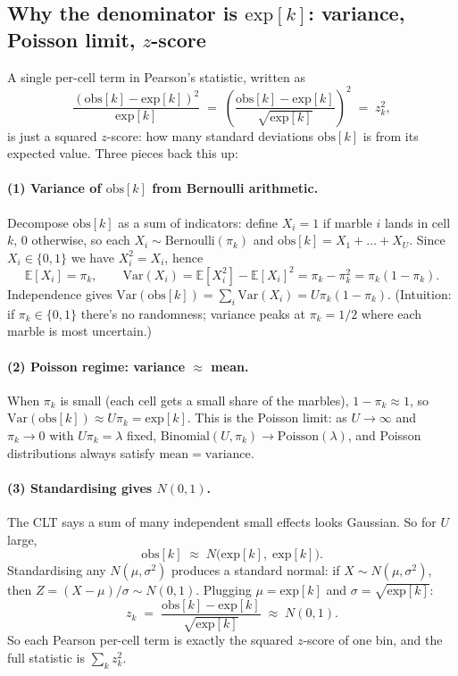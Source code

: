 \documentclass[11pt]{article}
\newcommand{\E}{\mathbb{E}}
\newcommand{\Var}{\mathrm{Var}}
\newcommand{\Pois}{\mathrm{Poisson}}
\newcommand{\Bin}{\mathrm{Binomial}}
\newcommand{\obs}{\mathrm{obs}}
\newcommand{\expc}{\mathrm{exp}}
\begin{document}
\subsection{Why the denominator is $\expc[k]$: variance, Poisson limit, $z$-score}

A single per-cell term in Pearson's statistic, written as
\[
   \frac{(\obs[k] - \expc[k])^2}{\expc[k]}
   \;=\; \left( \frac{\obs[k] - \expc[k]}{\sqrt{\expc[k]}} \right)^{\!2}
   \;=\; z_k^2,
\]
is just a squared $z$-score: how many standard deviations $\obs[k]$ is from
its expected value. Three pieces back this up:

\paragraph{(1) Variance of $\obs[k]$ from Bernoulli arithmetic.}
Decompose $\obs[k]$ as a sum of indicators: define
$X_i = 1$ if marble $i$ lands in cell $k$, $0$ otherwise, so each
$X_i \sim \mathrm{Bernoulli}(\pi_k)$ and $\obs[k] = X_1 + \dots + X_U$.
Since $X_i \in \{0,1\}$ we have $X_i^2 = X_i$, hence
\[
   \E[X_i] = \pi_k,
   \qquad
   \Var(X_i) = \E[X_i^2] - \E[X_i]^2 = \pi_k - \pi_k^2 = \pi_k(1-\pi_k).
\]
Independence gives $\Var(\obs[k]) = \sum_i \Var(X_i) = U\pi_k(1-\pi_k)$.
(Intuition: if $\pi_k \in \{0, 1\}$ there's no randomness; variance peaks at
$\pi_k = 1/2$ where each marble is most uncertain.)

\paragraph{(2) Poisson regime: variance $\approx$ mean.}
When $\pi_k$ is small (each cell gets a small share of the marbles),
$1 - \pi_k \approx 1$, so $\Var(\obs[k]) \approx U\pi_k = \expc[k]$. This is
the Poisson limit: as $U \to \infty$ and $\pi_k \to 0$ with $U\pi_k = \lambda$
fixed, $\Bin(U,\pi_k) \to \Pois(\lambda)$, and Poisson distributions always
satisfy $\mathrm{mean} = \mathrm{variance}$.

\paragraph{(3) Standardising gives $N(0,1)$.}
The CLT says a sum of many independent small effects looks Gaussian. So for
$U$ large,
\[
   \obs[k] \;\approx\; N\bigl(\expc[k],\; \expc[k]\bigr).
\]
Standardising any $N(\mu, \sigma^2)$ produces a standard normal: if
$X \sim N(\mu,\sigma^2)$, then $Z = (X-\mu)/\sigma \sim N(0,1)$. Plugging
$\mu = \expc[k]$ and $\sigma = \sqrt{\expc[k]}$:
\[
   z_k \;=\; \frac{\obs[k] - \expc[k]}{\sqrt{\expc[k]}}
   \;\approx\; N(0,1).
\]
So each Pearson per-cell term is exactly the squared $z$-score of one bin,
and the full statistic is $\sum_k z_k^2$.
\end{document}
